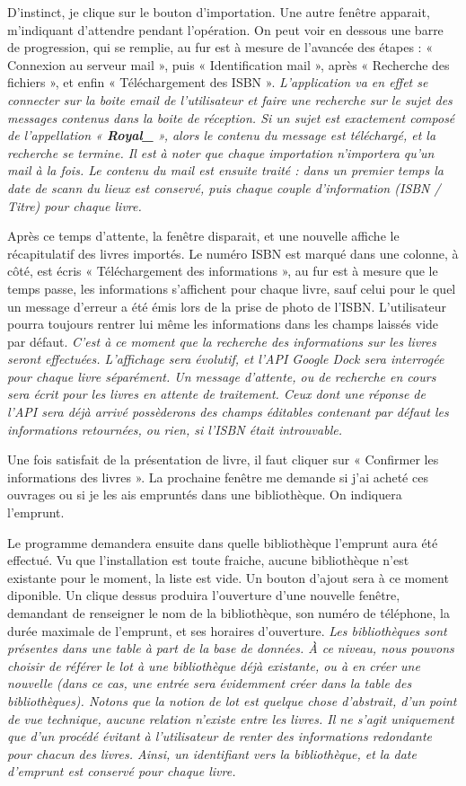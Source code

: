 D'instinct, je clique sur le bouton d'importation.
Une autre fenêtre apparait, m'indiquant d'attendre pendant l'opération. 
On peut voir en dessous une barre de progression, qui se remplie, au fur est à mesure de l'avancée des étapes : 
« Connexion au serveur mail », puis « Identification mail », après « Recherche des fichiers », et enfin « Téléchargement des ISBN ».
\emph{L'application va en effet se connecter sur la boite email de l'utilisateur et faire une recherche sur le sujet des messages contenus dans la boite de réception.
	Si un sujet est exactement composé de l'appellation « \textbf{Royal\_} », alors le contenu du message est téléchargé, et la recherche se termine.
	Il est à noter que chaque importation n'importera qu'un mail à la fois. 
	Le contenu du mail est ensuite traité : dans un premier temps la date de scann du lieux est conservé, puis chaque couple d'information (ISBN \slash{} Titre) pour chaque livre. 
}

Après ce temps d'attente, la fenêtre disparait, et une nouvelle affiche le récapitulatif des livres importés.
Le numéro ISBN est marqué dans une colonne, à côté, est écris « Téléchargement des informations », au fur est à mesure que le temps passe, les informations s'affichent pour chaque livre, sauf celui pour le quel un message d'erreur a été émis lors de la prise de photo de l'ISBN. 
L'utilisateur pourra toujours rentrer lui même les informations dans les champs laissés vide par défaut. 
\emph{C'est à ce moment que la recherche des informations sur les livres seront effectuées. 
	L'affichage sera évolutif, et l'API Google Dock sera interrogée pour chaque livre séparément. 
	Un message d'attente, ou de recherche en cours sera écrit pour les livres en attente de traitement. 
	Ceux dont une réponse de l'API sera déjà arrivé possèderons des champs éditables contenant par défaut les informations retournées, ou rien, si l'ISBN était introuvable. 
}

Une fois satisfait de la présentation de livre, il faut cliquer sur « Confirmer les informations des livres ». 
La prochaine fenêtre me demande si j'ai acheté ces ouvrages ou si je les ais empruntés dans une bibliothèque. 
On indiquera l'emprunt.

Le programme demandera ensuite dans quelle bibliothèque l'emprunt aura été effectué. 
Vu que l'installation est toute fraiche, aucune bibliothèque n'est existante pour le moment, la liste est vide.
Un bouton d'ajout sera à ce moment diponible. 
Un clique dessus produira l'ouverture d'une nouvelle fenêtre, demandant de renseigner le nom de la bibliothèque, son numéro de téléphone, la durée maximale de l'emprunt, et ses horaires d'ouverture. 
\emph{Les bibliothèques sont présentes dans une table à part de la base de données.
	À ce niveau, nous pouvons choisir de référer le lot à une bibliothèque déjà existante, ou à en créer une nouvelle
	(dans ce cas, une entrée sera évidemment créer dans la table des bibliothèques). 
	Notons que la notion de lot est quelque chose d'abstrait, d'un point de vue technique, aucune relation n'existe entre les livres.
	Il ne s'agit uniquement que d'un procédé évitant à l'utilisateur de renter des informations redondante pour chacun des livres.
	Ainsi, un identifiant vers la bibliothèque, et la date d'emprunt est conservé pour chaque livre.
}

